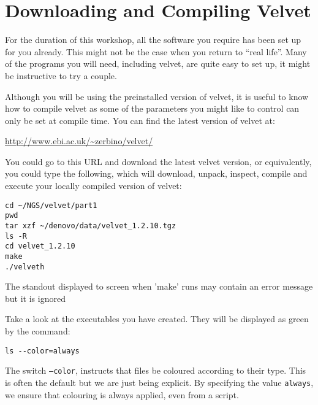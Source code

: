 \section{Downloading and Compiling Velvet}
\begin{note}
For the duration of this workshop, all the software you require has been set up
for you already. This might not be the case when you return to ``real life''. Many
of the programs you will need, including velvet, are quite easy to set up, it
might be instructive to try a couple.
\end{note}

\begin{information}
Although you will be using the preinstalled version of velvet, it is useful to
know how to compile velvet as some of the parameters you might like to control
can only be set at compile time. You can find the latest version of velvet at:

{\centering
\url{http://www.ebi.ac.uk/~zerbino/velvet/}
 
}

You could go to this URL and download the latest velvet version, or
equivalently, you could type the following, which will download, unpack,
inspect, compile and execute your locally compiled version of velvet:
\begin{lstlisting}
cd ~/NGS/velvet/part1
pwd
tar xzf ~/denovo/data/velvet_1.2.10.tgz
ls -R
cd velvet_1.2.10
make
./velveth
\end{lstlisting}
The standout displayed to screen when 'make' runs may contain an error message but it is ignored
\end{information}

\begin{steps}
Take a look at the executables you have created. They will be displayed as green
by the command:
\begin{lstlisting}
ls --color=always
\end{lstlisting}
\end{steps}

\begin{note}
The switch \texttt{--color}, instructs that files be coloured according to their
type. This is often the default but we are just being explicit. By specifying
the value \texttt{always}, we ensure that colouring is always applied, even from
a script.
\end{note}

